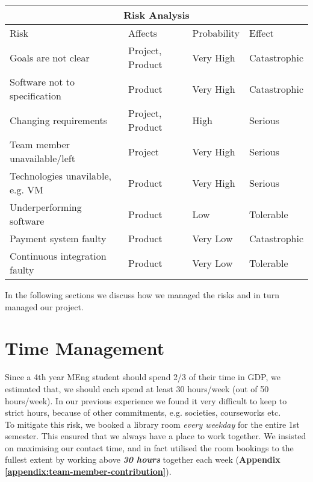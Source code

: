 \begin{center}

\begin{longtable}{ |p{5.7cm}|p{2cm}|p{2.3cm}|p{2.7cm}| }

 \hline
 	\multicolumn{4}{|c|}{Risk Analysis} \\
 \hline
 	Risk & Affects & Probability & Effect  \\
  \hline
 	 Goals are not clear & Project, Product & Very High & Catastrophic \\
   \hline
   Software not to specification & Product & Very High & Catastrophic \\
   \hline
   Changing requirements & Project, Product & High & Serious \\
  \hline
  Team member unavailable/left & Project & Very High & Serious \\
  \hline
  Technologies unavilable, e.g. VM & Product & Very High & Serious \\
  \hline
  Underperforming software & Product & Low & Tolerable \\
  \hline
  Payment system faulty & Product & Very Low & Catastrophic \\
  \hline
  Continuous integration faulty & Product & Very Low & Tolerable \\
  \hline

\end{longtable}

\label{tab:risk}

\end{center}

In the following sections we discuss how we managed the risks and in turn managed our project.

\section{Time Management}
\label{sec:time-management}
Since a 4th year MEng student should spend 2/3 of their time in GDP, we estimated that, we should each spend at least 30 hours/week (out of 50 hours/week). In our previous experience we found it very difficult to keep to strict hours, because of other commitments, e.g. societies, courseworks etc.\\

To mitigate this risk, we booked a library room \textit{every weekday} for the entire 1st semester. This ensured that we always have a place to work together. We insisted on maximising our contact time, and in fact utilised the room bookings to the fullest extent by working above \textit{\textbf{30 hours}} together each week (\textbf{Appendix \ref{appendix:team-member-contribution}}).\\


